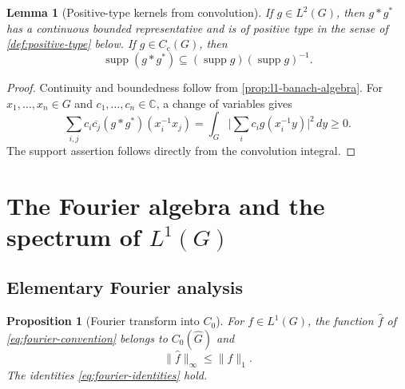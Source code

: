 \documentclass[11pt]{article}
\newtheorem{proposition}[theorem]{Proposition}
\newtheorem{lemma}[theorem]{Lemma}
\theoremstyle{definition}
\theoremstyle{remark}
\newcommand{\C}{\mathbb C}
\newcommand{\supp}{\operatorname{supp}}
\newcommand{\Cc}{C_{\mathrm c}}
\newcommand{\Czero}{C_0}
\newcommand{\Lp}[1]{L^{#1}}
\newcommand{\dual}[1]{\widehat{#1}}
\newcommand{\abs}[1]{\lvert #1\rvert}
\newcommand{\norm}[1]{\lVert #1\rVert}
\begin{document}
\begin{lemma}[Positive-type kernels from convolution]
\label{lem:convolution-positive-type}
If $g\in\Lp2(G)$, then $g*g^*$ has a continuous bounded representative and is of
positive type in the sense of \cref{def:positive-type} below.  If $g\in\Cc(G)$, then
\[
  \supp(g*g^*)\subseteq(\supp g)(\supp g)^{-1}.
\]
\end{lemma}

\begin{proof}
Continuity and boundedness follow from \cref{prop:l1-banach-algebra}.  For
$x_1,\ldots,x_n\in G$ and $c_1,\ldots,c_n\in\C$, a change of variables gives
\[
 \sum_{i,j}c_i\overline{c_j}(g*g^*)(x_i^{-1}x_j)
 =\int_G\abs{\sum_i c_i g(x_i^{-1}y)}^2\,dy\geq0.
\]
The support assertion follows directly from the convolution integral.
\end{proof}

\section{The Fourier algebra and the spectrum of $\Lp1(G)$}
\label{sec:l1-spectrum}

\subsection{Elementary Fourier analysis}

\begin{proposition}[Fourier transform into $\Czero$]
\label{prop:riemann-lebesgue}
For $f\in\Lp1(G)$, the function $\widehat f$ of
\eqref{eq:fourier-convention} belongs to $\Czero(\dual G)$ and
\[
  \norm{\widehat f}_\infty\leq\norm f_1.
\]
The identities \eqref{eq:fourier-identities} hold.
\end{proposition}
\end{document}

